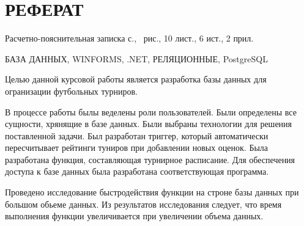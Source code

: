 \section*{\centering РЕФЕРАТ}
\setcounter{page}{2}

Расчетно-пояснительная записка \pageref{LastPage} с., \totalfigures\ рис., 10 лист., 6 ист., 2 прил.

БАЗА ДАННЫХ, WINFORMS, .NET, РЕЛЯЦИОННЫЕ, PostgreSQL

Целью данной курсовой работы является разработка базы данных для огранизации футбольных турниров.

В процессе работы былы веделены роли пользователей.
Были определены все сущности, хрянящие в базе данных.
Были выбраны технологии для решения поставленной задачи.
Был разработан триггер, который автоматически пересчитывает рейтинги туниров при добавлении новых оценок.
Была разработана функция, составляющая турнирное расписание.
Для обеспечения доступа к базе данных была разработана соответствующая программа.

Проведено исследование быстродействия функции на строне базы данных при большом обьеме данных.  
Из результатов исследования следует, что время выполнения функции увеличивается при увеличении объема данных.